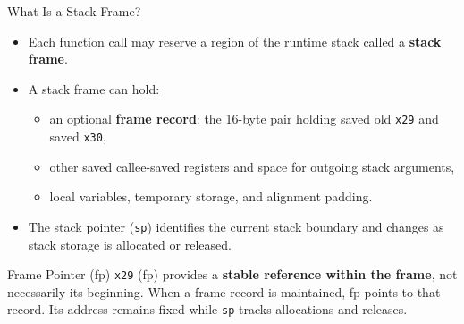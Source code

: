\documentclass[aspectratio=169,11pt,t]{beamer}
\newcommand{\key}[1]{\textbf{#1}}
\newcommand{\bits}[1]{\texttt{#1}}
\begin{document}
\begin{frame}{What Is a Stack Frame?}

\begin{itemize}\setlength{\itemsep}{6pt}
  \item Each function call may reserve a region of the runtime stack called a \key{stack frame}.
  \item A stack frame can hold:
  \begin{itemize}\setlength{\itemsep}{3pt}
    \item an optional \key{frame record}: the 16-byte pair holding saved old \bits{x29} and saved \bits{x30},
    \item other saved callee-saved registers and space for outgoing stack arguments,
    \item local variables, temporary storage, and alignment padding.
  \end{itemize}
  \item The stack pointer (\bits{sp}) identifies the current stack boundary and changes as stack storage is allocated or released.
\end{itemize}

\vfill

\begin{block}{Frame Pointer (fp)}
\bits{x29} (fp) provides a \key{stable reference within the frame}, not necessarily its beginning. When a frame record is maintained, fp points to that record. Its address remains fixed while \bits{sp} tracks allocations and releases.
\end{block}

\end{frame}
\end{document}
